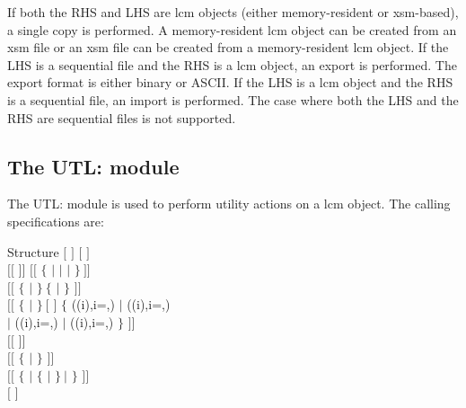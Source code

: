 If both the RHS and LHS are {\sc lcm} objects (either memory-resident or {\sc xsm}-based), a single copy is
performed. A memory-resident {\sc lcm} object can be created from an {\sc xsm} file or an {\sc xsm}
file can be created from a memory-resident {\sc lcm} object. If the LHS is a sequential file and the
RHS is a {\sc lcm} object, an export is performed. The export
format is either binary or ASCII.
If the LHS is a {\sc lcm} object and the RHS is a sequential
file, an import is performed. The case where both the LHS and the RHS are
sequential files is not supported.

\clearpage

\subsection{The UTL: module}\label{sect:UTLData}

The UTL: module is used to perform utility actions on a {\sc lcm} object.
The calling specifications are:

\begin{DataStructure}{Structure }
$[$  \moc{:=} $]$  $[$  $]$ \moc{::} \\
$[[$  $]]$  $[[$  $\{$   $|$
  $|$  $|$  $\}~]]$ \\
$[[$  $\{$  $|$  $\}~\{$  $|$ \moc{*} $\}$ $]]$ \\
$[[$  $\{$  $|$  $\}~[$  $]$  \moc{=} $\{$
((i),i=,) $|$ ((i),i=,) \\
$|$ ((i),i=,) $|$ ((i),i=,) $\}$ $]]$ \\
$[[$   $]]$ \\
$[[$  $\{$  $|$  $\}$  $]]$ \\ $[[$ $\{$
 $|$  $\{$  $|$  $\}~|$  $\}$   $]]$ \\
$[$  $]$ \moc{;}
\end{DataStructure}

